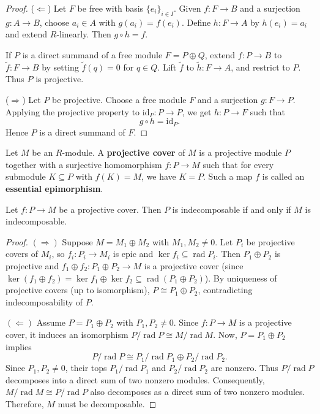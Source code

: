 \begin{proof}
($\Leftarrow$) Let \(F\) be free with basis \(\{e_i\}_{i\in I}\). Given \(f:F\to B\) and a surjection \(g:A\to B\), choose \(a_i\in A\) with \(g(a_i)=f(e_i)\). Define \(h:F\to A\) by \(h(e_i)=a_i\) and extend \(R\)-linearly. Then \(g\circ h=f\).

If \(P\) is a direct summand of a free module \(F=P\oplus Q\), extend \(f:P\to B\) to \(\tilde f:F\to B\) by setting \(\tilde f(q)=0\) for \(q\in Q\). Lift \(\tilde f\) to \(\tilde h:F\to A\), and restrict to \(P\). Thus \(P\) is projective.

($\Rightarrow$) Let \(P\) be projective. Choose a free module \(F\) and a surjection \(g:F\to P\). Applying the projective property to \(\mathrm{id}_P:P\to P\), we get \(h:P\to F\) such that
\[
g\circ h=\mathrm{id}_P.
\]
Hence \(P\) is a direct summand of \(F\).
\end{proof}


\begin{defn}
Let $M$ be an $R$-module. A \textbf{projective cover} of $M$ is a projective module $P$ together with a surjective homomorphism $f: P \to M$ such that for every submodule $K \subseteq P$ with $f(K) = M$, we have $K = P$. Such a map $f$ is called an \textbf{essential epimorphism}.
\end{defn}

\begin{prop}
Let $f: P \to M$ be a projective cover. Then $P$ is indecomposable if and only if $M$ is indecomposable.
\end{prop}
\begin{proof}
\((\Rightarrow)\) Suppose \( M = M_1 \oplus M_2 \) with \( M_1, M_2 \neq 0 \).  
Let \( P_i \) be projective covers of \( M_i \), so \( f_i : P_i \to M_i \) is epic and \(\ker f_i \subseteq \operatorname{rad} P_i\).  
Then \( P_1 \oplus P_2 \) is projective and \( f_1 \oplus f_2 : P_1 \oplus P_2 \to M \) is a projective cover (since \(\ker(f_1 \oplus f_2) = \ker f_1 \oplus \ker f_2 \subseteq \operatorname{rad}(P_1 \oplus P_2)\)).  
By uniqueness of projective covers (up to isomorphism), \( P \cong P_1 \oplus P_2 \), contradicting indecomposability of \( P \).

\((\Leftarrow)\) Assume \( P = P_1 \oplus P_2 \) with \( P_1, P_2 \neq 0 \). Since \( f : P \to M \) is a projective cover, it induces an isomorphism \( P/\operatorname{rad}P \cong M/\operatorname{rad}M \). 
Now, \( P = P_1 \oplus P_2 \) implies 
\[
P/\operatorname{rad}P \cong P_1/\operatorname{rad}P_1 \oplus P_2/\operatorname{rad}P_2.
\]
Since \( P_1, P_2 \neq 0 \), their tops \( P_1/\operatorname{rad}P_1 \) and \( P_2/\operatorname{rad}P_2 \) are nonzero. Thus \( P/\operatorname{rad}P \) decomposes into a direct sum of two nonzero modules. Consequently, \( M/\operatorname{rad}M \cong P/\operatorname{rad}P \) also decomposes as a direct sum of two nonzero modules. Therefore, \( M \) must be decomposable.
\end{proof}

